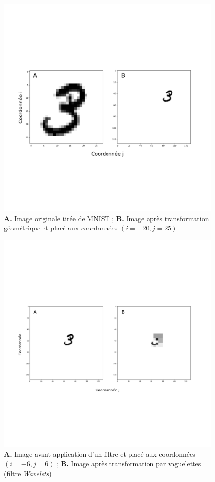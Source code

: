 \begin{figure}[th]
\centering
\includegraphics[scale=0.3]{Figures/mnist_reshape}
\decoRule %
\caption[Figure]{\textbf{A.} Image originale tirée de MNIST ; \textbf{B.} Image après transformation géométrique et placé aux coordonnées $(i=-20,j=25)$}
\label{fig:mnist_reshape}
\end{figure}

\begin{figure}[th]
\centering
\includegraphics[scale=0.25]{Figures/wavelet_effect}
\decoRule %
\caption[Figure]{\textbf{A.} Image avant application d'un filtre et placé aux coordonnées $(i=-6,j=6)$ ; \textbf{B.} Image après transformation par vaguelettes (filtre \textit{Wavelets})}
\label{fig:wavelet_effect}
\end{figure}

